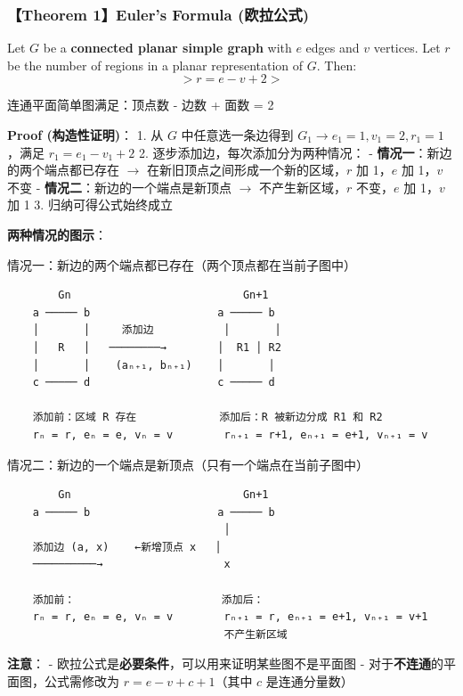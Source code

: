 \documentclass[10pt,a4paper,openany]{ctexbook}
\theoremstyle{definition}
\theoremstyle{remark}
\renewenvironment{quote}
  {\list{}{\leftmargin=1em\rightmargin=0pt\topsep=0.5pt\partopsep=0pt}\item[]}
  {\endlist}
\begin{document}
\subsubsection{【Theorem 1】Euler's Formula (欧拉公式)}

\begin{quote}
Let $G$ be a \textbf{connected planar simple graph} with $e$ edges and $v$ vertices. Let $r$ be the number of regions in a planar representation of $G$. Then:
\[
> r = e - v + 2
> 
\]


连通平面简单图满足：顶点数 - 边数 + 面数 = 2

\textbf{Proof (构造性证明)}：
1. 从 $G$ 中任意选一条边得到 $G_1 \to e_1=1, v_1=2, r_1=1$，满足 $r_1 = e_1 - v_1 + 2$
2. 逐步添加边，每次添加分为两种情况：
- \textbf{情况一}：新边的两个端点都已存在 $\rightarrow$ 在新旧顶点之间形成一个新的区域，$r$ 加 1，$e$ 加 1，$v$ 不变
- \textbf{情况二}：新边的一个端点是新顶点 $\rightarrow$ 不产生新区域，$r$ 不变，$e$ 加 1，$v$ 加 1
3. 归纳可得公式始终成立

\textbf{两种情况的图示}：

情况一：新边的两个端点都已存在（两个顶点都在当前子图中）

{\footnotesize\begin{verbatim}
        Gn                           Gn+1
    a ───── b                    a ───── b
    │       │     添加边           │       │
    │   R   │   ────────→        │  R1 │ R2
    │       │    (aₙ₊₁, bₙ₊₁)    │       │
    c ───── d                    c ───── d
    
    添加前：区域 R 存在             添加后：R 被新边分成 R1 和 R2
    rₙ = r, eₙ = e, vₙ = v        rₙ₊₁ = r+1, eₙ₊₁ = e+1, vₙ₊₁ = v
\end{verbatim}}


情况二：新边的一个端点是新顶点（只有一个端点在当前子图中）

{\footnotesize\begin{verbatim}
        Gn                           Gn+1
    a ───── b                    a ───── b
                                  │
    添加边 (a, x)    ←新增顶点 x   │
    ──────────→                   x
    
    添加前：                       添加后：
    rₙ = r, eₙ = e, vₙ = v        rₙ₊₁ = r, eₙ₊₁ = e+1, vₙ₊₁ = v+1
                                  不产生新区域
\end{verbatim}}


\textbf{注意}：
- 欧拉公式是\textbf{必要条件}，可以用来证明某些图不是平面图
- 对于\textbf{不连通}的平面图，公式需修改为 $r = e - v + c + 1$（其中 $c$ 是连通分量数）

\end{quote}
\end{document}
